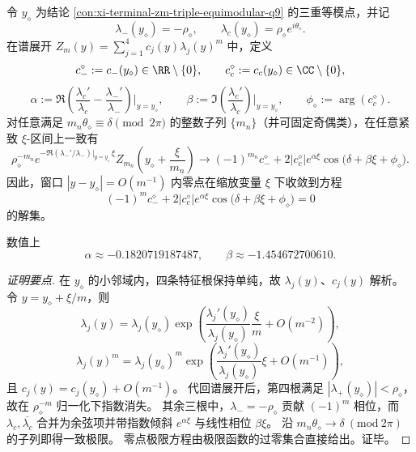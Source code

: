 \begin{conclusion}\label{con:xi-terminal-zm-triple-equimodular-local-scaling}
令 \(y_\diamond\) 为结论 \ref{con:xi-terminal-zm-triple-equimodular-q9} 的三重等模点，并记
\[
\lambda_-(y_\diamond)=-\rho_\diamond,\qquad
\lambda_c(y_\diamond)=\rho_\diamond e^{i\theta_\diamond}.
\]
在谱展开
\(
Z_m(y)=\sum_{j=1}^4 c_j(y)\lambda_j(y)^m
\)
中，定义
\[
c_-^\diamond:=c_-(y_\diamond)\in\RR\setminus\{0\},\qquad
c_c^\diamond:=c_c(y_\diamond)\in\CC\setminus\{0\},
\]
\[
\alpha:=
\Re\!\left(\frac{\lambda_c'}{\lambda_c}-\frac{\lambda_-'}{\lambda_-}\right)\Big|_{y=y_\diamond},
\qquad
\beta:=
\Im\!\left(\frac{\lambda_c'}{\lambda_c}\right)\Big|_{y=y_\diamond},
\qquad
\phi_\diamond:=\arg(c_c^\diamond).
\]
对任意满足 \(m_n\theta_\diamond\equiv\delta\pmod{2\pi}\) 的整数子列 \(\{m_n\}\)（并可固定奇偶类），在任意紧致 \(\xi\)-区间上一致有
\[
\rho_\diamond^{-m_n}
e^{-\Re(\lambda_-'/\lambda_-)|_{y=y_\diamond}\,\xi}
Z_{m_n}\!\left(y_\diamond+\frac{\xi}{m_n}\right)
\longrightarrow
(-1)^{m_n}c_-^\diamond
+2|c_c^\diamond|e^{\alpha\xi}
\cos\!\bigl(\delta+\beta\xi+\phi_\diamond\bigr).
\]
因此，窗口 \(|y-y_\diamond|=O(m^{-1})\) 内零点在缩放变量 \(\xi\) 下收敛到方程
\[
(-1)^m c_-^\diamond
+2|c_c^\diamond|e^{\alpha\xi}
\cos\!\bigl(\delta+\beta\xi+\phi_\diamond\bigr)=0
\]
的解集。

数值上
\[
\alpha\approx -0.1820719187487,\qquad
\beta\approx -1.454672700610.
\]
\end{conclusion}
\begin{proof}[证明要点]
在 \(y_\diamond\) 的小邻域内，四条特征根保持单纯，故 \(\lambda_j(y)\)、\(c_j(y)\) 解析。
令 \(y=y_\diamond+\xi/m\)，则
\[
\lambda_j(y)
=
\lambda_j(y_\diamond)\exp\!\left(
\frac{\lambda_j'(y_\diamond)}{\lambda_j(y_\diamond)}\frac{\xi}{m}
+O(m^{-2})
\right),
\]
\[
\lambda_j(y)^m
=
\lambda_j(y_\diamond)^m
\exp\!\left(
\frac{\lambda_j'(y_\diamond)}{\lambda_j(y_\diamond)}\xi
+O(m^{-1})
\right),
\]
且 \(c_j(y)=c_j(y_\diamond)+O(m^{-1})\)。
代回谱展开后，第四根满足 \(|\lambda_+(y_\diamond)|<\rho_\diamond\)，故在 \(\rho_\diamond^{-m}\) 归一化下指数消失。
其余三根中，\(\lambda_-=-\rho_\diamond\) 贡献 \((-1)^m\) 相位，而 \(\lambda_c,\overline{\lambda_c}\) 合并为余弦项并带指数倾斜 \(e^{\alpha\xi}\) 与线性相位 \(\beta\xi\)。
沿 \(m_n\theta_\diamond\to\delta\ (\mathrm{mod}\ 2\pi)\) 的子列即得一致极限。
零点极限方程由极限函数的过零集合直接给出。证毕。
\end{proof}

